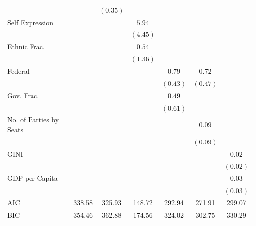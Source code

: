 \documentclass[a4paper]{article}\usepackage[]{graphicx}\usepackage[]{color}
\begin{document}
\begin{table}
\begin{center}
\begin{tabular}{l c c c c c c }
                        &               & $(0.35)$      &              &               &              &              \\
Self Expression         &               &               & $5.94$       &               &              &              \\
                        &               &               & $(4.45)$     &               &              &              \\
Ethnic Frac.            &               &               & $0.54$       &               &              &              \\
                        &               &               & $(1.36)$     &               &              &              \\
Federal                 &               &               &              & $0.79$        & $0.72$       &              \\
                        &               &               &              & $(0.43)$      & $(0.47)$     &              \\
Gov. Frac.              &               &               &              & $0.49$        &              &              \\
                        &               &               &              & $(0.61)$      &              &              \\
No. of Parties by Seats &               &               &              &               & $0.09$       &              \\
                        &               &               &              &               & $(0.09)$     &              \\
GINI                    &               &               &              &               &              & $0.02$       \\
                        &               &               &              &               &              & $(0.02)$     \\
GDP per Capita          &               &               &              &               &              & $0.03$       \\
                        &               &               &              &               &              & $(0.03)$     \\
\hline
AIC                     & 338.58        & 325.93        & 148.72       & 292.94        & 271.91       & 299.07       \\
BIC                     & 354.46        & 362.88        & 174.56       & 324.02        & 302.75       & 330.29       \\

\end{tabular}
\end{center}
\end{table}
\end{document}
